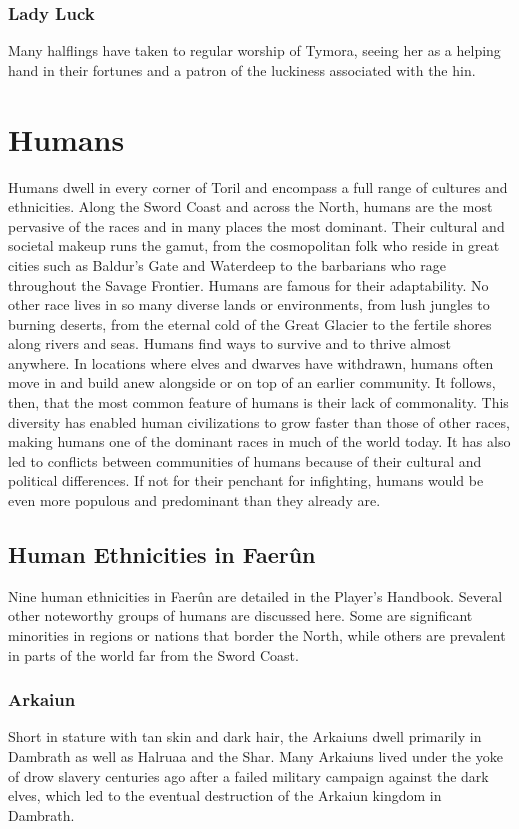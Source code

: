\documentclass[10pt,a4paper,twoside,twocolumn,openany,bg=print,nodeprecatedcode]{dndbook}
\begin{document}
\subsubsection{Lady Luck}
Many halflings have taken to regular worship of Tymora, seeing her as a helping hand in their fortunes and a patron of the luckiness associated with the hin.
\section{Humans}
Humans dwell in every corner of Toril and encompass a full range of cultures and ethnicities. Along the Sword Coast and across the North, humans are the most pervasive of the races and in many places the most dominant. Their cultural and societal makeup runs the gamut, from the cosmopolitan folk who reside in great cities such as Baldur's Gate and Waterdeep to the barbarians who rage throughout the Savage Frontier.
Humans are famous for their adaptability. No other race lives in so many diverse lands or environments, from lush jungles to burning deserts, from the eternal cold of the Great Glacier to the fertile shores along rivers and seas. Humans find ways to survive and to thrive almost anywhere. In locations where elves and dwarves have withdrawn, humans often move in and build anew alongside or on top of an earlier community.
It follows, then, that the most common feature of humans is their lack of commonality. This diversity has enabled human civilizations to grow faster than those of other races, making humans one of the dominant races in much of the world today. It has also led to conflicts between communities of humans because of their cultural and political differences. If not for their penchant for infighting, humans would be even more populous and predominant than they already are.
\subsection{Human Ethnicities in Faerûn}
Nine human ethnicities in Faerûn are detailed in the Player's Handbook. Several other noteworthy groups of humans are discussed here. Some are significant minorities in regions or nations that border the North, while others are prevalent in parts of the world far from the Sword Coast.
\subsubsection{Arkaiun}
Short in stature with tan skin and dark hair, the Arkaiuns dwell primarily in Dambrath as well as Halruaa and the Shar. Many Arkaiuns lived under the yoke of drow slavery centuries ago after a failed military campaign against the dark elves, which led to the eventual destruction of the Arkaiun kingdom in Dambrath.
\end{document}
